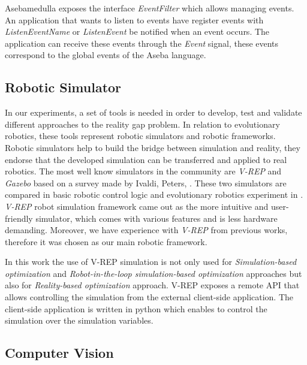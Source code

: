 Asebamedulla exposes the interface \emph{EventFilter} which allows managing events. An application that wants to listen to events have register events with \emph{ListenEventName} or \emph{ListenEvent} be notified when an event occurs. The application can receive these events through the \emph{Event} signal, these events correspond to the global events of the Aseba language.

\subsection{Robotic Simulator}

In our experiments, a set of tools is needed in order to develop, test and validate different approaches to the reality gap problem. In relation to evolutionary robotics, these tools represent robotic simulators and robotic frameworks. Robotic simulators help to build the bridge between simulation and reality, they endorse that the developed simulation can be transferred and applied to real robotics. The most well know simulators in the community are \emph{V-REP} \citep{rohmer2013v} and \emph{Gazebo} \citep{koenig2004design} based on a survey made by Ivaldi, Peters, \citep{ivaldi2014tools}. These two simulators are compared in basic robotic control logic and evolutionary robotics experiment in \citep{nogueira2014comparative}. \emph{V-REP} robot simulation framework came out as the more intuitive and user-friendly simulator, which comes with various features and is less hardware demanding. Moreover, we have experience with \emph{V-REP} from previous works, therefore it was chosen as our main robotic framework.

In this work the use of V-REP simulation is not only used for \emph{Simulation-based optimization} and \emph{Robot-in-the-loop simulation-based optimization} approaches but also for \emph{Reality-based optimization} approach. V-REP exposes a remote API that allows controlling the simulation from the external client-side application. The client-side application is written in python which enables to control the simulation over the simulation variables.

\subsection{Computer Vision}

